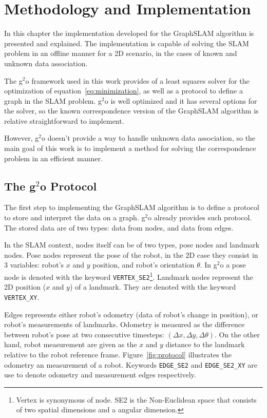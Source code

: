 \chapter{Methodology and Implementation}
\label{chap:implementation}
 
In this chapter the implementation developed for the GraphSLAM algorithm is presented and explained. The implementation is capable of solving the SLAM problem in an offline manner for a 2D scenario, in the cases of known and unknown data association.

The g$^2$o framework used in this work provides of a least squares solver for the optimization of equation~\eqref{eq:minimization}, as well as a protocol to define a graph in the SLAM problem. g$^2$o is well optimized and it has several options for the solver, so the known correspondence version of the GraphSLAM algorithm is relative straightforward to implement.

However, g$^2$o doesn't provide a way to handle unknown data association, so the main goal of this work is to implement a method for solving the correspondence problem in an efficient manner.

\section{The g$^2$o Protocol}

The first step to implementing the GraphSLAM algorithm is to define a protocol to store and interpret the data on a graph. g$^2$o already provides such protocol. The stored data are of two types: data from nodes, and data from edges. 

In the SLAM context, nodes itself can be of two types, pose nodes and landmark nodes. Pose nodes represent the pose of the robot, in the 2D case they consist in 3 variables: robot's $x$ and $y$ position, and robot's orientation $\theta$. In g$^2$o a pose node is denoted with the keyword \texttt{VERTEX\_SE2}\footnote{Vertex is synonymous of node. SE2 is the Non-Euclidean space that consists of two spatial dimensions and a angular dimension.}. Landmark nodes represent the 2D position ($x$ and $y$) of a landmark. They are denoted with the keyword \texttt{VERTEX\_XY}.

Edges represents either robot's odometry (data of robot's change in position), or robot's measurements of landmarks. Odometry is measured as the difference between robot's pose at two consecutive timesteps: $(\Delta x, \Delta y, \Delta \theta)$. On the other hand, robot measurement are given as the $x$ and $y$ distance to the landmark relative to the robot reference frame. Figure~\ref{fig:protocol} illustrates the odometry an measurement of a robot. Keywords \texttt{EDGE\_SE2} and \texttt{EDGE\_SE2\_XY} are use to denote odometry and measurement edges respectively.

